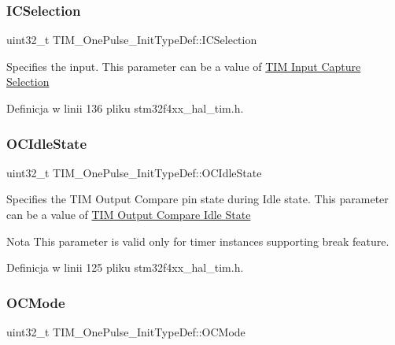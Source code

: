 \subsubsection{\texorpdfstring{I\+C\+Selection}{ICSelection}}
{\footnotesize\ttfamily uint32\+\_\+t T\+I\+M\+\_\+\+One\+Pulse\+\_\+\+Init\+Type\+Def\+::\+I\+C\+Selection}

Specifies the input. This parameter can be a value of \hyperlink{group___t_i_m___input___capture___selection}{T\+IM Input Capture Selection} 

Definicja w linii 136 pliku stm32f4xx\+\_\+hal\+\_\+tim.\+h.

\mbox{\label{struct_t_i_m___one_pulse___init_type_def_aef11bcea1dbf3e3ddf2a4bbc2846bb1e}} 
\subsubsection{\texorpdfstring{O\+C\+Idle\+State}{OCIdleState}}
{\footnotesize\ttfamily uint32\+\_\+t T\+I\+M\+\_\+\+One\+Pulse\+\_\+\+Init\+Type\+Def\+::\+O\+C\+Idle\+State}

Specifies the T\+IM Output Compare pin state during Idle state. This parameter can be a value of \hyperlink{group___t_i_m___output___compare___idle___state}{T\+IM Output Compare Idle State} \begin{DoxyNote}{Nota}
This parameter is valid only for timer instances supporting break feature. 
\end{DoxyNote}


Definicja w linii 125 pliku stm32f4xx\+\_\+hal\+\_\+tim.\+h.

\mbox{\label{struct_t_i_m___one_pulse___init_type_def_af127f01162853e39ae616b43cc52b674}} 
\subsubsection{\texorpdfstring{O\+C\+Mode}{OCMode}}
{\footnotesize\ttfamily uint32\+\_\+t T\+I\+M\+\_\+\+One\+Pulse\+\_\+\+Init\+Type\+Def\+::\+O\+C\+Mode}

